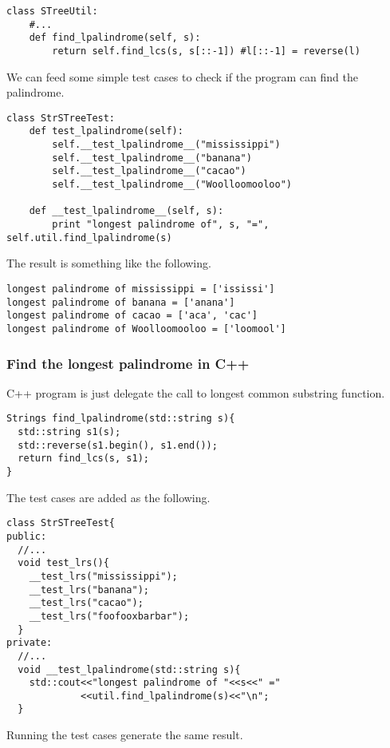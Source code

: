 \documentclass{article}
\begin{document}
\begin{lstlisting}
class STreeUtil:
    #...
    def find_lpalindrome(self, s):
        return self.find_lcs(s, s[::-1]) #l[::-1] = reverse(l)
\end{lstlisting}

We can feed some simple test cases to check if the program can
find the palindrome.

\begin{lstlisting}
class StrSTreeTest:
    def test_lpalindrome(self):
        self.__test_lpalindrome__("mississippi")
        self.__test_lpalindrome__("banana")
        self.__test_lpalindrome__("cacao")
        self.__test_lpalindrome__("Woolloomooloo")

    def __test_lpalindrome__(self, s):
        print "longest palindrome of", s, "=", self.util.find_lpalindrome(s)
\end{lstlisting}

The result is something like the following.

\begin{verbatim}
longest palindrome of mississippi = ['ississi']
longest palindrome of banana = ['anana']
longest palindrome of cacao = ['aca', 'cac']
longest palindrome of Woolloomooloo = ['loomool']
\end{verbatim}

\subsubsection*{Find the longest palindrome in C++}
C++ program is just delegate the call to longest common substring
function.

\begin{lstlisting}
Strings find_lpalindrome(std::string s){
  std::string s1(s);
  std::reverse(s1.begin(), s1.end());
  return find_lcs(s, s1);
}
\end{lstlisting}

The test cases are added as the following.

\begin{lstlisting}
class StrSTreeTest{
public:
  //...
  void test_lrs(){
    __test_lrs("mississippi");
    __test_lrs("banana");
    __test_lrs("cacao");
    __test_lrs("foofooxbarbar");
  }
private:
  //...
  void __test_lpalindrome(std::string s){
    std::cout<<"longest palindrome of "<<s<<" ="
             <<util.find_lpalindrome(s)<<"\n";
  }
\end{lstlisting}

Running the test cases generate the same result.
\end{document}
